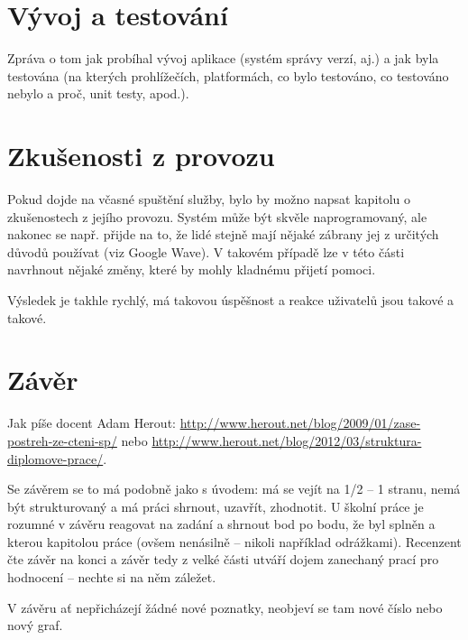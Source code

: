 \documentclass[12pt,oneside,final]{fithesis2}
\begin{document}
\chapter{Vývoj a testování}
Zpráva o tom jak probíhal vývoj aplikace (systém správy verzí, aj.) a jak byla testována (na kterých prohlížečích, platformách, co bylo testováno, co testováno nebylo a proč, unit testy, apod.).

\chapter{Zkušenosti z provozu}
Pokud dojde na včasné spuštění služby, bylo by možno napsat kapitolu o zkušenostech z jejího provozu. Systém může být skvěle naprogramovaný, ale nakonec se např. přijde na to, že lidé stejně mají nějaké zábrany jej z určitých důvodů používat (viz Google Wave). V takovém případě lze v této části navrhnout nějaké změny, které by mohly kladnému přijetí pomoci.

Výsledek je takhle rychlý, má takovou úspěšnost a reakce uživatelů jsou takové a takové.

\chapter{Závěr}
Jak píše docent Adam Herout: \url{http://www.herout.net/blog/2009/01/zase-postreh-ze-cteni-sp/} nebo \url{http://www.herout.net/blog/2012/03/struktura-diplomove-prace/}.

Se závěrem se to má podobně jako s úvodem: má se vejít na 1/2 – 1 stranu, nemá být strukturovaný a má práci shrnout, uzavřít, zhodnotit. U školní práce je rozumné v závěru reagovat na zadání a shrnout bod po bodu, že byl splněn a kterou kapitolou práce (ovšem nenásilně – nikoli například odrážkami). Recenzent čte závěr na konci a závěr tedy z velké části utváří dojem zanechaný prací pro hodnocení – nechte si na něm záležet.

V závěru ať nepřicházejí žádné nové poznatky, neobjeví se tam nové číslo nebo nový graf.


% 
% 
\end{document}
